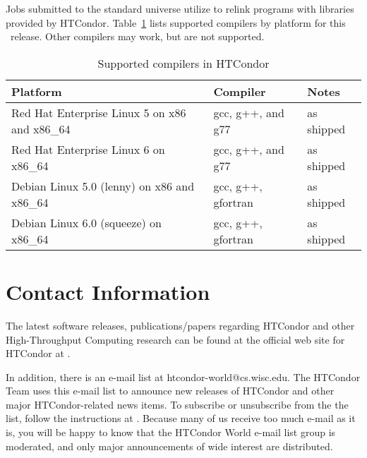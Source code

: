 Jobs submitted to the standard universe utilize 
to relink programs with libraries provided by HTCondor.
Table~\ref{supported-compile} lists supported compilers by
platform for this \VersionNotice\ release.
Other compilers may work, but are not supported.


\begin{center}
\begin{table}[hbt]
\begin{tabular}{|ll|l|} \hline
\textbf{Platform} & \textbf{Compiler} & \textbf{Notes}\\ \hline \hline
Red Hat Enterprise Linux 5 on x86 and x86\_64 & gcc, g++, and g77 & as shipped  \\ 
\hline
Red Hat Enterprise Linux 6 on x86\_64 & gcc, g++, and g77 & as shipped  \\ 
\hline
Debian Linux 5.0 (lenny) on x86 and x86\_64 & gcc, g++, gfortran & as shipped \\ 
\hline
Debian Linux 6.0 (squeeze) on x86\_64 & gcc, g++, gfortran & as shipped \\ 
\hline
\end{tabular}
\caption{\label{supported-compile}Supported compilers in HTCondor \VersionNotice}
\end{table}
\end{center}

 


\section{\label{contact-info}Contact Information}

The latest software releases, publications/papers regarding HTCondor and other 
High-Throughput Computing
research can be found at the official web site for HTCondor at  
.

In addition, there is an e-mail list at htcondor-world@cs.wisc.edu.
The HTCondor Team uses this e-mail list to announce new releases of
HTCondor and other major HTCondor-related news items.
To subscribe or unsubscribe from the the list, follow the instructions at  
.
Because many of us receive 
too much e-mail as it is, you will be happy to know that the
HTCondor World e-mail list group is 
moderated, and only major announcements of wide interest are distributed.

